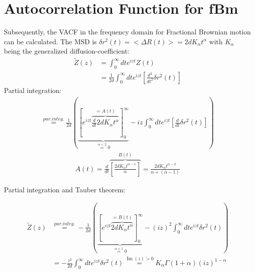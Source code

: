 \documentclass[
  a4paper,BCOR10mm,oneside,
  bibtotoc,idxtotoc,
  headsepline,footsepline,%
  fleqn,openbib
]{scrbook}
\begin{document}
\section{Autocorrelation Function for fBm}\label{VACF}
Subsequently, the VACF in the frequency domain for Fractional Brownian motion can be calculated. The MSD is $\delta r^{2}(t)= < \Delta R(t)>=2dK_{\alpha}t^{\alpha}$ with $K_{\alpha}$ being the generalized diffusion-coefficient:
\begin{align*}
 \tilde{Z}(z)&=\int_{0}^{\infty} d t e^{izt} Z(t) \\
 &=\frac{1}{2 d} \int_{0}^{\infty} d t e^{izt} \left[\frac{d^2}{dt^2}\delta r^2 (t) \right]
\end{align*}
Partial integration:
\begin{align*}
  \stackrel{par. integ.}{=} \frac{1}{2 d} \left( \underbrace{\left [ e^{izt}\overbrace{ \frac{d}{dt} 2dK_{\alpha}t^{\alpha}}^{=A(t)} \right]_{0}^{\infty}}_{\stackrel{\alpha < 2} {=} 0}- i z \int_{0}^{\infty} d t e^{izt} \left[\frac{d}{dt}\delta r^2 (t)\right] \right) 
 \end{align*}
 \begin{align*}
 A(t)=\frac{d}{dt}\overbrace{ \left [\frac{2d K_{\alpha}t^{\alpha-1}}{\alpha} \right ]}^{B(t)}=\frac{2d K_{\alpha}t^{\alpha-2}}{\alpha+(\alpha-1)}
\end{align*}

Partial integration and Tauber theorem:

\begin{align*}
 \tilde{Z}(z) & \stackrel{par. integ.}{=} - \frac{1}{2 d} \left( \underbrace{\left [ e^{izt}\overbrace{  2dK_{\alpha}t^{\alpha}}^{=B(t)} \right]_{0}^{\infty}}_{\stackrel{\alpha < 1} {=} 0} - (iz)^2 \int_{0}^{\infty} d t e^{izt} \delta r^2 (t) \right) \\
  & = - \frac{z^2}{2 d}\int_{0}^{\infty} d t e^{izt} \delta r^2 (t)  \stackrel{\operatorname{Im}(z)> 0} {=}  K_{\alpha} \Gamma(1+\alpha)(i z)^{1-\alpha} 
\end{align*}
\end{document}
